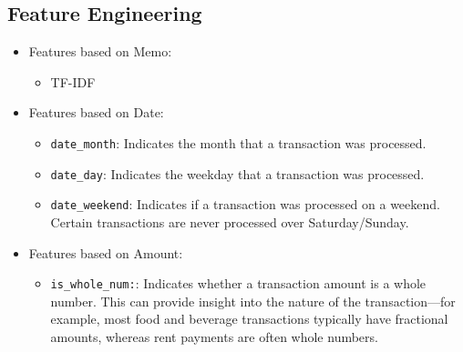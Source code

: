 \documentclass[12pt,letterpaper]{article}
\begin{document}
\subsection{Feature Engineering}
\begin{itemize}
    \item {Features based on Memo:}
        \begin{itemize}
            \item {TF-IDF}
        \end{itemize}
    \item {Features based on Date:}
        \begin{itemize}
            \item 
                \texttt{date\_month}: Indicates the month that a transaction was processed.            
            \item 
                \texttt{date\_day}: Indicates the weekday that a transaction was processed. 
                
            \item 
                \texttt{date\_weekend}: Indicates if a transaction was processed on a weekend. Certain transactions are never processed over Saturday/Sunday.
        \end{itemize}
    \item {Features based on Amount:}
        \begin{itemize}
            \item 
                \texttt{is\_whole\_num:}: Indicates whether a transaction amount is a whole number. This can provide insight into the nature of the transaction—for example, most food and beverage transactions typically have fractional amounts, whereas rent payments are often whole numbers. 
        \end{itemize}
\end{itemize}
\end{document}
